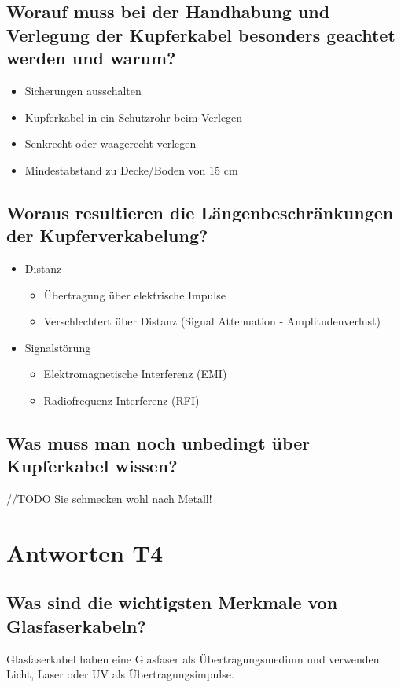 \subsection*{Worauf muss bei der Handhabung und Verlegung der Kupferkabel besonders geachtet werden und warum?}
\begin{itemize}
    \item Sicherungen ausschalten
    \item Kupferkabel in ein Schutzrohr beim Verlegen
    \item Senkrecht oder waagerecht verlegen
    \item Mindestabstand zu Decke/Boden von 15 cm
\end{itemize}

\subsection*{Woraus resultieren die Längenbeschränkungen der Kupferverkabelung?}
\begin{itemize}
    \item Distanz
    \begin{itemize}
        \item Übertragung über elektrische Impulse
        \item Verschlechtert über Distanz (Signal Attenuation - Amplitudenverlust)
    \end{itemize}
    \item Signalstörung
    \begin{itemize}
        \item Elektromagnetische Interferenz (EMI)
        \item Radiofrequenz-Interferenz (RFI)
    \end{itemize}
\end{itemize}

\subsection*{Was muss man noch unbedingt über Kupferkabel wissen?}
//TODO Sie schmecken wohl nach Metall!

\section{Antworten T4}
\subsection*{Was sind die wichtigsten Merkmale von Glasfaserkabeln?}
Glasfaserkabel haben eine Glasfaser als Übertragungsmedium und verwenden Licht, Laser oder UV als Übertragungsimpulse.

